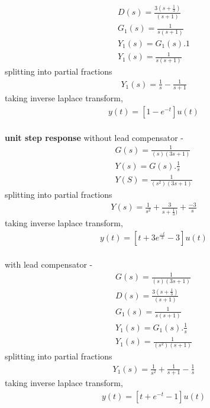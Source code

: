 \begin{enumerate}[label=\thesection.\arabic*.,ref=\thesection.\theenumi]
\begin{align}
D(s) = \frac{3(s+\frac{1}{3})}{(s+1)} \\
G_{1}(s) = \frac{1}{s(s+1)}\\
Y_{1}(s) = G_{1}(s).1\\
Y_{1}(s) = \frac{1}{s(s+1)}
\end{align}
splitting into partial fractions\\
\begin{align}
Y_{1}(s) = \frac{1}{s} - \frac{1}{s+1}
\end{align}
taking inverse laplace transform, \\
\begin{align}
y(t) = [ 1 - e^{-t}]u(t)
\end{align}
\\
\textbf{unit step response}
without lead compensator - \\
\begin{align}
G(s) = \frac{1}{(s)(3s+1)}\\
Y(s) = G(s).\frac{1}{s}\\
Y(S) = \frac{1}{(s^2)(3s+1)}
\end{align}
splitting into partial fractions\\
\begin{align}
Y(s) = \frac{1}{s^2} + \frac{3}{s+\frac{1}{3})} + \frac{-3}{s}
\end{align}
taking inverse laplace transform, \\
\begin{align}
y(t) = [t + 3e^{\frac{-t}{3}} - 3]u(t)
\end{align}
\\
with lead compensator - \\
\begin{align}
G(s) = \frac{1}{(s)(3s+1)}\\
D(s) = \frac{3(s+\frac{1}{3})}{(s+1)} \\
G_{1}(s) = \frac{1}{s(s+1)}\\
Y_{1}(s) = G_{1}(s).\frac{1}{s}\\
Y_{1}(s) = \frac{1}{(s^2)(s+1)}
\end{align}
splitting into partial fractions\\
\begin{align}
Y_{1}(s) = \frac{1}{s^2} + \frac{1}{s+1} - \frac{1}{s}
\end{align}
taking inverse laplace transform, \\
\begin{align}
y(t) = [t + e^{-t} - 1]u(t)
\end{align}
\\

\end{enumerate}
